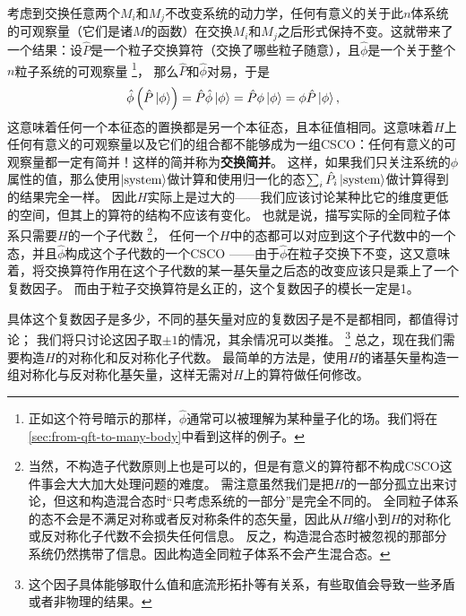 \documentclass[UTF8, a4paper]{ctexart}
\begin{document}
考虑到交换任意两个$M_i$和$M_j$不改变系统的动力学，任何有意义的关于此$n$体系统的可观察量（它们是诸$M$的函数）在交换$M_i$和$M_j$之后形式保持不变。这就带来了一个结果：设$\hat{P}$是一个粒子交换算符（交换了哪些粒子随意），且$\hat{\phi}$是一个关于整个$n$粒子系统的可观察量%
\footnote{正如这个符号暗示的那样，$\hat{\phi}$通常可以被理解为某种量子化的场。我们将在\autoref{sec:from-qft-to-many-body}中看到这样的例子。}，
那么$\hat{P}$和$\hat{\phi}$对易，于是
\[
    \hat{\phi} \left(\hat{P} \ket{\phi}\right) = \hat{P} \hat{\phi} \ket{\phi} = \hat{P} \phi \ket{\phi} = \phi \hat{P} \ket{\phi},
\]
这意味着任何一个本征态的置换都是另一个本征态，且本征值相同。这意味着$H$上任何有意义的可观察量以及它们的组合都不能够成为一组CSCO：任何有意义的可观察量都一定有简并！这样的简并称为\textbf{交换简并}。
这样，如果我们只关注系统的$\phi$属性的值，那么使用$\ket{\text{system}}$做计算和使用归一化的态$\sum_i \hat{P}_i \ket{\text{system}}$做计算得到的结果完全一样。
因此$H$实际上是过大的——我们应该讨论某种比它的维度更低的空间，但其上的算符的结构不应该有变化。
也就是说，描写实际的全同粒子体系只需要$H$的一个子代数%
\footnote{当然，不构造子代数原则上也是可以的，但是有意义的算符都不构成CSCO这件事会大大加大处理问题的难度。
需注意虽然我们是把$H$的一部分孤立出来讨论，但这和构造混合态时“只考虑系统的一部分”是完全不同的。
全同粒子体系的态不会是不满足对称或者反对称条件的态矢量，因此从$H$缩小到$H$的对称化或反对称化子代数不会损失任何信息。
反之，构造混合态时被忽视的那部分系统仍然携带了信息。因此构造全同粒子体系不会产生混合态。}，
任何一个$H$中的态都可以对应到这个子代数中的一个态，并且$\hat{\phi}$构成这个子代数的一个CSCO
——由于$\hat{\phi}$在粒子交换下不变，这又意味着，将交换算符作用在这个子代数的某一基矢量之后态的改变应该只是乘上了一个复数因子。
而由于粒子交换算符是幺正的，这个复数因子的模长一定是1。

具体这个复数因子是多少，不同的基矢量对应的复数因子是不是都相同，都值得讨论；
我们将只讨论这因子取$\pm 1$的情况，其余情况可以类推。%
\footnote{这个因子具体能够取什么值和底流形拓扑等有关系，有些取值会导致一些矛盾或者非物理的结果。}%
总之，现在我们需要构造$H$的对称化和反对称化子代数。
最简单的方法是，使用$H$的诸基矢量构造一组对称化与反对称化基矢量，这样无需对$H$上的算符做任何修改。
\end{document}
